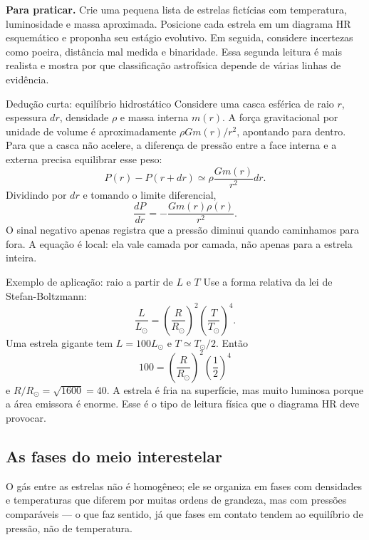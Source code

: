 \documentclass[11pt,a4paper]{article}
\begin{document}
\textbf{Para praticar.} Crie uma pequena lista de estrelas fictícias com temperatura, luminosidade e massa aproximada. Posicione cada estrela em um diagrama HR esquemático e proponha seu estágio evolutivo. Em seguida, considere incertezas como poeira, distância mal medida e binaridade. Essa segunda leitura é mais realista e mostra por que classificação astrofísica depende de várias linhas de evidência.

\begin{lessonblock}[borderline west={2pt}{0pt}{astroGold}]{Dedução curta: equilíbrio hidrostático}
Considere uma casca esférica de raio $r$, espessura $dr$, densidade $\rho$ e massa interna $m(r)$. A força gravitacional por unidade de volume é aproximadamente $\rho Gm(r)/r^2$, apontando para dentro. Para que a casca não acelere, a diferença de pressão entre a face interna e a externa precisa equilibrar esse peso:
\[
P(r)-P(r+dr)\simeq \rho\frac{Gm(r)}{r^2}dr.
\]
Dividindo por $dr$ e tomando o limite diferencial,
\[
\frac{dP}{dr}=-\frac{Gm(r)\rho(r)}{r^2}.
\]
O sinal negativo apenas registra que a pressão diminui quando caminhamos para fora. A equação é local: ela vale camada por camada, não apenas para a estrela inteira.
\end{lessonblock}

\begin{lessonblock}{Exemplo de aplicação: raio a partir de $L$ e $T$}
Use a forma relativa da lei de Stefan-Boltzmann:
\[
\frac{L}{L_\odot}=\left(\frac{R}{R_\odot}\right)^2\left(\frac{T}{T_\odot}\right)^4.
\]
Uma estrela gigante tem $L=100L_\odot$ e $T\simeq T_\odot/2$. Então
\[
100=\left(\frac{R}{R_\odot}\right)^2\left(\frac{1}{2}\right)^4
\]
e $R/R_\odot=\sqrt{1600}=40$. A estrela é fria na superfície, mas muito luminosa porque a área emissora é enorme. Esse é o tipo de leitura física que o diagrama HR deve provocar.
\end{lessonblock}

\subsection*{As fases do meio interestelar}

O gás entre as estrelas não é homogêneo; ele se organiza em fases com densidades e temperaturas que diferem por muitas ordens de grandeza, mas com pressões comparáveis --- o que faz sentido, já que fases em contato tendem ao equilíbrio de pressão, não de temperatura.
\end{document}
